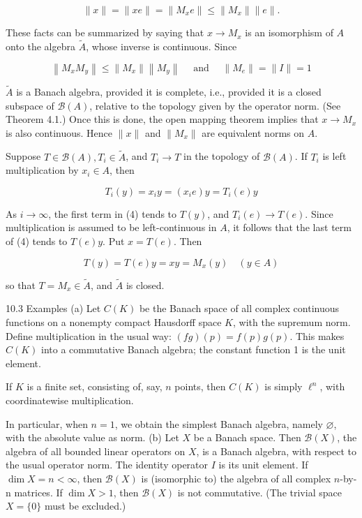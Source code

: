 \documentclass[10pt]{article}
\begin{document}
$$
\|x\|=\|x e\|=\left\|M_{x} e\right\| \leq\left\|M_{x}\right\|\|e\| .
$$

These facts can be summarized by saying that $x \rightarrow M_{x}$ is an isomorphism of $A$ onto the algebra $\tilde{A}$, whose inverse is continuous. Since

$$
\left\|M_{x} M_{y}\right\| \leq\left\|M_{x}\right\|\left\|M_{y}\right\| \quad \text { and } \quad\left\|M_{e}\right\|=\|I\|=1
$$

$\tilde{A}$ is a Banach algebra, provided it is complete, i.e., provided it is a closed subspace of $\mathscr{B}(A)$, relative to the topology given by the operator norm. (See Theorem 4.1.) Once this is done, the open mapping theorem implies that $x \rightarrow M_{x}$ is also continuous. Hence $\|x\|$ and $\left\|M_{x}\right\|$ are equivalent norms on $A$.

Suppose $T \in \mathscr{B}(A), T_{i} \in \tilde{A}$, and $T_{i} \rightarrow T$ in the topology of $\mathscr{B}(A)$. If $T_{i}$ is left multiplication by $x_{i} \in A$, then

$$
T_{i}(y)=x_{i} y=\left(x_{i} e\right) y=T_{i}(e) y
$$

As $i \rightarrow \infty$, the first term in (4) tends to $T(y)$, and $T_{i}(e) \rightarrow T(e)$. Since multiplication is assumed to be left-continuous in $A$, it follows that the last term of (4) tends to $T(e) y$. Put $x=T(e)$. Then

$$
T(y)=T(e) y=x y=M_{x}(y) \quad(y \in A)
$$

so that $T=M_{x} \in \tilde{A}$, and $\tilde{A}$ is closed.

10.3 Examples (a) Let $C(K)$ be the Banach space of all complex continuous functions on a nonempty compact Hausdorff space $K$, with the supremum norm. Define multiplication in the usual way: $(f g)(p)=f(p) g(p)$. This makes $C(K)$ into a commutative Banach algebra; the constant function 1 is the unit element.

If $K$ is a finite set, consisting of, say, $n$ points, then $C(K)$ is simply $\ell^{n}$, with coordinatewise multiplication.

In particular, when $n=1$, we obtain the simplest Banach algebra, namely $\varnothing$, with the absolute value as norm.
(b) Let $X$ be a Banach space. Then $\mathscr{B}(X)$, the algebra of all bounded linear operators on $X$, is a Banach algebra, with respect to the usual operator norm. The identity operator $I$ is its unit element. If $\operatorname{dim} X=n<\infty$, then $\mathscr{B}(X)$ is (isomorphic to) the algebra of all complex $n$-by-n matrices. If $\operatorname{dim} X>1$, then $\mathscr{B}(X)$ is not commutative. (The trivial space $X=\{0\}$ must be excluded.)
\end{document}

